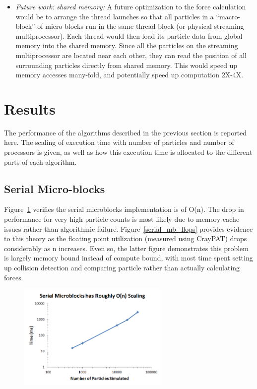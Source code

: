 \documentclass[11pt]{article} %
\begin{document}
\begin{itemize}
\item {\em Future work: shared memory: } A future optimization to the force calculation would be to arrange the thread launches so that all particles in a ``macro-block'' of micro-blocks run in the same thread block (or physical streaming multiprocessor). Each thread would then load its particle data from global memory into the shared memory. Since all the particles on the streaming multiprocessor are located near each other, they can read the position of all surrounding particles directly from shared memory. This would speed up memory accesses many-fold, and potentially speed up computation 2X-4X.
\end{itemize}





\section{Results}
\label{results-section}

The performance of the algorithms described in the previous section is reported here. The scaling of execution time with number of particles and number of processors is given, as well as how this execution time is allocated to the different parts of each algorithm.

\subsection{Serial Micro-blocks}

Figure~\ref{serial_mb_n} verifies the serial microblocks implementation is of O(n). The drop in performance for very high particle counts is most likely due to memory cache issues rather than algorithmic failure. Figure~\ref{serial_mb_flops} provides evidence to this theory as the floating point utilization (measured using CrayPAT) drops considerably as n increases. Even so, the latter figure demonstrates this problem is largely memory bound instead of compute bound, with most time spent setting up collision detection and comparing particle rather than actually calculating forces.

\begin{figure}[!h]
\centering
\includegraphics[width=0.65\textwidth]{figures/serial_mb_n.png}
\caption{}
\label{serial_mb_n}
\end{figure}
\end{document}
